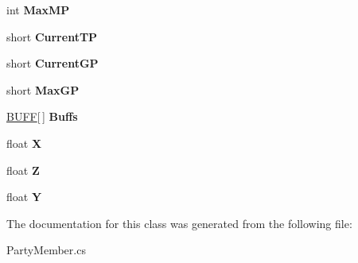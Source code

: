 \begin{DoxyCompactItemize}
\item 
\hypertarget{classffxivlib_1_1_party_member_a438c57f32517c6471541333504747b33}{int {\bfseries Max\-M\-P}}\label{classffxivlib_1_1_party_member_a438c57f32517c6471541333504747b33}

\item 
\hypertarget{classffxivlib_1_1_party_member_a191224412d870b90e3dce6e70b22705d}{short {\bfseries Current\-T\-P}}\label{classffxivlib_1_1_party_member_a191224412d870b90e3dce6e70b22705d}

\item 
\hypertarget{classffxivlib_1_1_party_member_aaff1d9559c087ddd5a9437427f54630b}{short {\bfseries Current\-G\-P}}\label{classffxivlib_1_1_party_member_aaff1d9559c087ddd5a9437427f54630b}

\item 
\hypertarget{classffxivlib_1_1_party_member_a8a0eb631fc7e9cfb9a0d2f0f8cf68ed4}{short {\bfseries Max\-G\-P}}\label{classffxivlib_1_1_party_member_a8a0eb631fc7e9cfb9a0d2f0f8cf68ed4}

\item 
\hypertarget{classffxivlib_1_1_party_member_ad6be84a7fbd4c70a2ab826ae264bf952}{\hyperlink{structffxivlib_1_1_b_u_f_f}{B\-U\-F\-F}\mbox{[}$\,$\mbox{]} {\bfseries Buffs}}\label{classffxivlib_1_1_party_member_ad6be84a7fbd4c70a2ab826ae264bf952}

\item 
\hypertarget{classffxivlib_1_1_party_member_ae36af049209a8e7753db0495ae087afc}{float {\bfseries X}}\label{classffxivlib_1_1_party_member_ae36af049209a8e7753db0495ae087afc}

\item 
\hypertarget{classffxivlib_1_1_party_member_a2c945dd5a32f0b733527566849e1465f}{float {\bfseries Z}}\label{classffxivlib_1_1_party_member_a2c945dd5a32f0b733527566849e1465f}

\item 
\hypertarget{classffxivlib_1_1_party_member_adba751b8dca3725402af945fbdf0bfc3}{float {\bfseries Y}}\label{classffxivlib_1_1_party_member_adba751b8dca3725402af945fbdf0bfc3}

\end{DoxyCompactItemize}


The documentation for this class was generated from the following file\-:\begin{DoxyCompactItemize}
\item 
Party\-Member.\-cs\end{DoxyCompactItemize}
